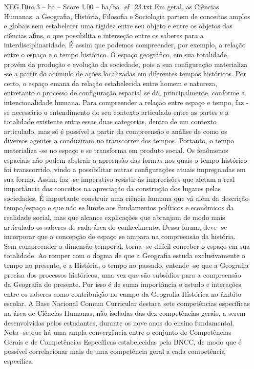 \begin{textsample}{NEG Dim 3 – ba – Score 1.00 – ba/ba\_ef\_23.txt}
Em geral, as Ciências Humanas, a Geografia, História, Filosofia e Sociologia partem de conceitos amplos e globais sem estabelecer uma rigidez entre seu objeto e entre os objetos das ciências afins, o que possibilita e interseção entre os saberes para a interdisciplinaridade.
É assim que podemos compreender, por exemplo, a relação entre o espaço e o tempo histórico.
O espaço geográfico, em sua totalidade, provém da produção e evolução da sociedade, pois a sua configuração materializa -se a partir do acúmulo de ações localizadas em diferentes tempos históricos.
Por certo, o espaço emana da relação estabelecida entre homem e natureza, entretanto o processo de configuração espacial se dá, principalmente, conforme a intencionalidade humana.
Para compreender a relação entre espaço e tempo, faz -se necessário o entendimento do seu contexto articulado entre as partes e a totalidade existente entre essas duas categorias, dentro de um contexto articulado, mas só é possível a partir da compreensão e análise de como os diversos agentes a conduziram no transcorrer dos tempos.
Portanto, o tempo materializa -se no espaço e se transforma em produto social.
Os fenômenos espaciais não podem abstrair a apreensão das formas nos quais o tempo histórico foi transcorrido, vindo a possibilitar outras configurações atuais impregnadas em sua forma.
Assim, faz -se imperativo resistir às imprecisões que afetam a real importância dos conceitos na apreciação da construção dos lugares pelas sociedades.
É importante construir uma ciência humana que vá além da descrição tempo/espaço e que não se limite aos fundamentos políticos e econômicos da realidade social, mas que alcance explicações que abranjam de modo mais articulado os saberes de cada área do conhecimento.
Dessa forma, deve -se incorporar que a concepção de espaço se ampara na compreensão da história.
Sem compreender a dimensão temporal, torna -se difícil conceber o espaço em sua totalidade.
Ao romper com o dogma de que a Geografia estuda exclusivamente o tempo no presente, e a História, o tempo no passado, entende -se que a Geografia precisa dos processos históricos, uma vez que são subsídios para a compreensão da Geografia do presente.
Por isso é de suma importância o estudo e interações entre os saberes como contribuição no campo da Geografia Histórica no âmbito escolar.
A Base Nacional Comum Curricular destaca sete competências específicas na área de Ciências Humanas, não isoladas das dez competências gerais, a serem desenvolvidas pelos estudantes, durante os nove anos do ensino fundamental.
Nota -se que há uma ampla convergência entre o conjunto de Competências Gerais e de Competências Específicas estabelecidas pela BNCC, de modo que é possível correlacionar mais de uma competência geral a cada competência específica.

\end{textsample}
